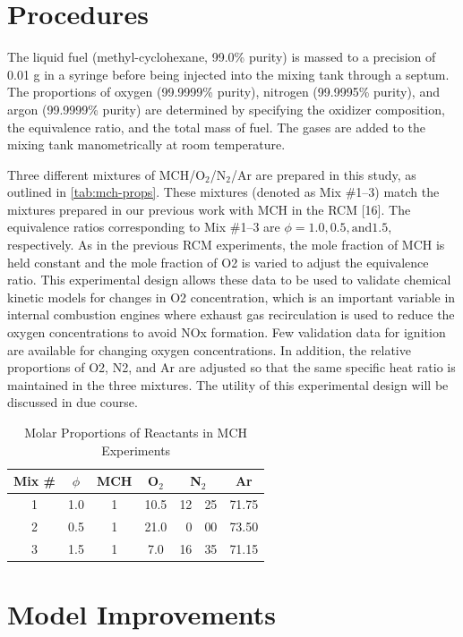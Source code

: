 \documentclass[12pt, letterpaper]{article}
\begin{document}
\section{Procedures}
The liquid fuel (methyl-cyclohexane, 99.0\% purity) is massed to a precision 
of 0.01 g in a syringe before being injected into the mixing tank through a 
septum. The proportions of oxygen (99.9999\% purity), nitrogen (99.9995\% 
purity), and argon (99.9999\% purity) are determined by specifying the oxidizer 
composition, the equivalence ratio, and the total mass of fuel. The gases are 
added to the mixing tank manometrically at room temperature. 

Three different mixtures of MCH/O$_2$/N$_2$/Ar are prepared in this study, as 
outlined in \autoref{tab:mch-props}. These mixtures (denoted as Mix \#1–3) match the mixtures 
prepared in our previous work with MCH in the RCM [16]. The equivalence ratios 
corresponding to Mix \#1–3 are $\phi=1.0, 0.5, \mathrm{and} 1.5$, respectively. 
As in the previous RCM experiments, the mole fraction of MCH is held constant 
and the mole fraction of O2 is varied to adjust the equivalence ratio. This 
experimental design allows these data to be used to validate chemical kinetic 
models for changes in O2 concentration, which is an important variable in 
internal combustion engines where exhaust gas recirculation is used to reduce 
the oxygen concentrations to avoid NOx formation. Few validation data for 
ignition are available for changing oxygen concentrations. In addition, the 
relative proportions of O2, N2, and Ar are adjusted so that the same specific 
heat ratio is maintained in the three mixtures. The utility of this 
experimental design will be discussed in due course.

\begin{table}
    \centering
    \caption{Molar Proportions of Reactants in MCH Experiments}
    \label{tab:mch-props}
    \begin{tabular}{*{4}{c} r@{.} l c}
    \toprule
    Mix \# & $\phi$ & MCH & O$_2$ & \multicolumn{2}{c}{N$_2$} & Ar \\
    \midrule
    1 & 1.0 & 1 & 10.5 & 12 & 25 & 71.75 \\
    2 & 0.5 & 1 & 21.0 &  0 & 00 & 73.50 \\
    3 & 1.5 & 1 &  7.0 & 16 & 35 & 71.15 \\
    \bottomrule
    \end{tabular}
\end{table}

\section{Model Improvements}
\label{sec:model-improvements}
\end{document}
